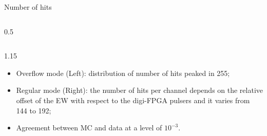 \documentclass{beamer}
\begin{document}
\begin{frame}{Number of hits}
\begin{columns}
\begin{column}{0.5\framewidth}
\begin{figure}[H]
              \label{fig:un} 
              \end{figure} 
        \end{column}
    \end{columns}
     \vspace{-3mm}
     \begin{columns}
        \begin{column}{1.15\framewidth}
         \begin{itemize}
            \item Overflow mode (Left): distribution of number of hits peaked in 255; 
            \item Regular mode (Right): the number of hits per channel depends on the relative offset of the EW  with respect to the digi-FPGA pulsers and it varies from 
    144 to 192;
                \item Agreement between MC and data at a level of $10^{-3}$.
    
        \end{itemize}  
        \end{column}
        \end{columns}
    \end{frame}
\end{document}
